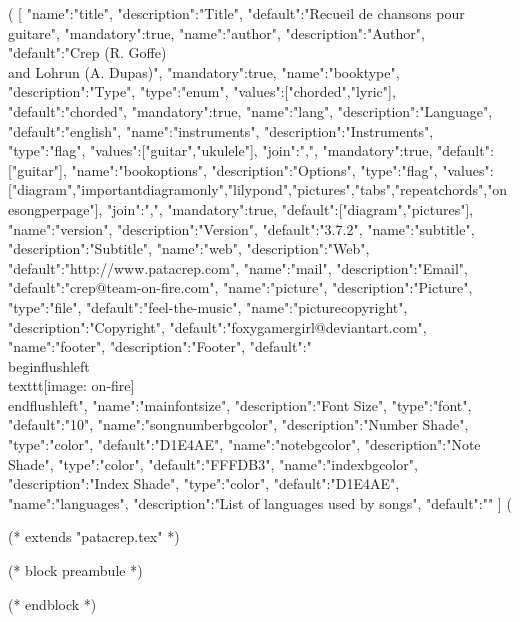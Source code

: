 %
%
%

(%
[
{"name":"title", "description":"Title", "default":"Recueil de chansons pour guitare", "mandatory":true},
{"name":"author", "description":"Author", "default":"Crep (R. Goffe) \\and Lohrun (A. Dupas)", "mandatory":true},
{"name":"booktype", "description":"Type", "type":"enum", "values":["chorded","lyric"], "default":"chorded", "mandatory":true},
{"name":"lang", "description":"Language", "default":"english"},
{"name":"instruments", "description":"Instruments", "type":"flag", "values":["guitar","ukulele"], "join":",", "mandatory":true, "default":["guitar"]},
{"name":"bookoptions", "description":"Options", "type":"flag", "values":["diagram","importantdiagramonly","lilypond","pictures","tabs","repeatchords","onesongperpage"], "join":",", "mandatory":true, "default":["diagram","pictures"]},
{"name":"version", "description":"Version", "default":"3.7.2"},
{"name":"subtitle", "description":"Subtitle"},
{"name":"web", "description":"Web", "default":"http://www.patacrep.com"},
{"name":"mail", "description":"Email", "default":"crep@team-on-fire.com"},
{"name":"picture", "description":"Picture", "type":"file", "default":"feel-the-music"},
{"name":"picturecopyright", "description":"Copyright", "default":"foxygamergirl@deviantart.com"},
{"name":"footer", "description":"Footer", "default":"\\begin{flushleft}\\texttt{[image: on-fire]}\\end{flushleft}"},
{"name":"mainfontsize", "description":"Font Size", "type":"font", "default":"10"},
{"name":"songnumberbgcolor", "description":"Number Shade", "type":"color", "default":"D1E4AE"},
{"name":"notebgcolor", "description":"Note Shade", "type":"color", "default":"FFFDB3"},
{"name":"indexbgcolor", "description":"Index Shade", "type":"color", "default":"D1E4AE"},
{"name":"languages", "description":"List of languages used by songs", "default":""}
]
(%

(* extends "patacrep.tex" *)

(* block preambule *)
\usepackage{venturisold}
\renewcommand{\printchord}[1]{\mdseries\ttfamily\upshape#1}

\usepackage{licence}
(* endblock *)